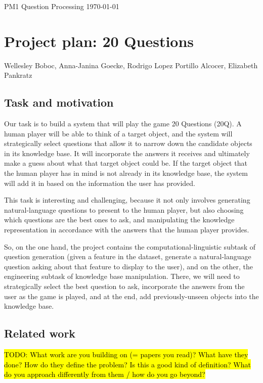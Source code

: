 \documentclass[a4paper,12pt]{article}
\begin{document}
\noindent PM1 Question Processing \hfill \today

\section*{Project plan: 20 Questions}
\noindent Wellesley Boboc, Anna-Janina Goecke, Rodrigo Lopez Portillo Alcocer, Elizabeth Pankratz

\subsection*{Task and motivation}

Our task is to build a system that will play the game 20 Questions (20Q).
A human player will be able to think of a target object, and the system will strategically select questions that allow it to narrow down the candidate objects in its knowledge base.
It will incorporate the answers it receives and ultimately make a guess about what that target object could be.
If the target object that the human player has in mind is not already in its knowledge base, the system will add it in based on the information the user has provided.

This task is interesting and challenging, because it not only involves generating natural-language questions to present to the human player, but also choosing which questions are the best ones to ask, and manipulating the knowledge representation in accordance with the answers that the human player provides.

So, on the one hand, the project contains the computational-linguistic subtask of question generation (given a feature in the dataset, generate a natural-language question asking about that feature to display to the user), and on the other, the engineering subtask of knowledge base manipulation.
There, we will need to strategically select the best question to ask, incorporate the answers from the user as the game is played, and at the end, add previously-unseen objects into the knowledge base.

\subsection*{Related work}

\hl{TODO: What work are you building on (= papers you read)?  What have they done? How do they define the problem? Is this a good kind of definition? What do you approach differently from them / how do you go beyond?}
\end{document}
